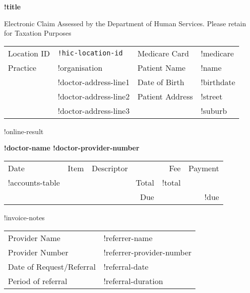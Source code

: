 \documentclass[12pt]{article}
\begin{document}
\begin{center}
{\bf \Large !title}

\vspace{3mm}

{\footnotesize Electronic Claim Assessed by the Department of Human Services. 
  Please retain for Taxation Purposes }

\end{center}

\vspace{8mm}

\begin{tabular}{llll}
  Location ID & \texttt{!hic-location-id} & Medicare Card & !medicare \\
  Practice & !organisation & Patient Name & !name \\
  & !doctor-address-line1 & Date of Birth & !birthdate \\
  & !doctor-address-line2 & Patient Address & !street \\
  & !doctor-address-line3 & & !suburb \\
\end{tabular}

\vspace{3mm}

!online-result

\vspace{3mm}

{\bf !doctor-name !doctor-provider-number}

\vspace{3mm}

\begin{tabularx}{\textwidth}{llp{50mm}rrr}
Date & Item & Descriptor & & Fee & Payment \\ \cmidrule(l){1-6}
!accounts-table
\cmidrule(l){5-6}
& & & Total & !total  & \\
& & & Due & & !due \\
\end{tabularx}

!invoice-notes

\vspace{3mm}

\begin{tabular}{ll}
Provider Name & !referrer-name \\
Provider Number & !referrer-provider-number \\
Date of Request/Referral & !referral-date \\
Period of referral & !referral-duration \\
\end{tabular}
\end{document}
